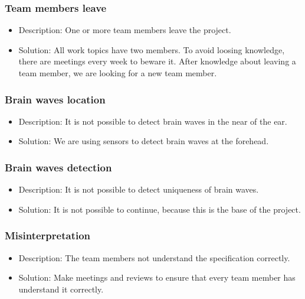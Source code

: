 \subsubsection*{Team members leave}
\begin{itemize}
 \item Description: One or more team members leave the project.
 \item Solution: All work topics have two members. To avoid loosing knowledge, there are meetings every week to beware it. After knowledge about leaving a team member, we are looking for a new team member.
\end{itemize}

\subsubsection*{Brain waves location}
\begin{itemize}
 \item  Description: It is not possible to detect brain waves in the near of the ear.
 \item Solution: We are using sensors to detect brain waves at the forehead.
\end{itemize}

\subsubsection*{Brain waves detection}
\begin{itemize}
 \item Description: It is not possible to detect uniqueness of brain waves.
 \item Solution: It is not possible to continue, because this is the base of the project.
\end{itemize}

\subsubsection*{Misinterpretation}
\begin{itemize}
 \item Description: The team members not understand the specification correctly.
 \item Solution: Make meetings and reviews to ensure that every team member has understand it correctly.
\end{itemize}

